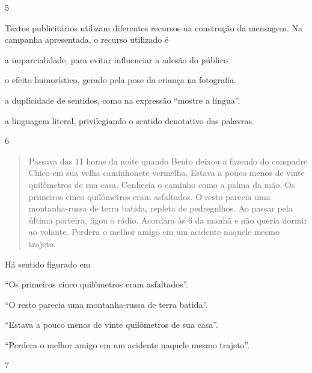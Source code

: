 \num{5}

Textos publicitários utilizam diferentes recursos na construção da
mensagem. Na campanha apresentada, o recurso utilizado é

\begin{escolha}
\item
a imparcialidade, para evitar influenciar a adesão do público.
\item
o efeito humorístico, gerado pela pose da criança na fotografia.
\item
a duplicidade de sentidos, como na expressão ``mostre a língua''.
\item
a linguagem literal, privilegiando o sentido denotativo das palavras.
\end{escolha}

\num{6}

\begin{quote}
Passava das 11 horas da noite quando Bento deixou a fazendo do compadre
Chico em sua velha caminhonete vermelha. Estava a pouco menos de vinte
quilômetros de sua casa. Conhecia o caminho como a palma da mão. Os
primeiros cinco quilômetros eram asfaltados. O resto parecia uma
montanha-russa de terra batida, repleta de pedregulhos. Ao passar pela
última porteira, ligou o rádio. Acordara às 6 da manhã e não queria
dormir ao volante. Perdera o melhor amigo em um acidente naquele mesmo
trajeto.
\end{quote}


Há sentido figurado em

\begin{escolha}
\item ``Os primeiros cinco quilômetros eram asfaltados''.

\item ``O resto parecia uma montanha-russa de terra batida''.

\item ``Estava a pouco menos de vinte quilômetros de sua casa''.

\item ``Perdera o melhor amigo em um acidente naquele mesmo trajeto''.
\end{escolha}


\num{7}

